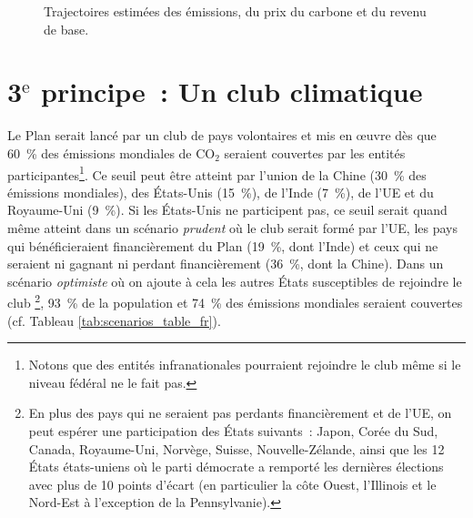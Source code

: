 \documentclass[a5paper,french,openany]{memoir}
\begin{document}
\begin{figure}[h!]
  \caption[Trajectoires (émissions, prix, revenu de base)]{Trajectoires estimées des émissions, du prix du carbone et du revenu de base.}\label{fig:trajectory}
\end{figure} 

\section{3$^\text{e}$ principe~: Un club climatique}

Le Plan serait lancé par un club de pays volontaires et mis en œuvre dès que 60~\% des émissions mondiales de CO$_\text{2}$ seraient couvertes par les entités participantes\footnote{Notons que des entités infranationales pourraient rejoindre le club même si le niveau fédéral ne le fait pas.}. Ce seuil peut être atteint par l'union de la Chine (30~\% des émissions mondiales), des États-Unis (15~\%), de l'Inde (7~\%), de l'UE et du Royaume-Uni (9~\%). Si les États-Unis ne participent pas, ce seuil serait quand même atteint dans un scénario \textit{prudent} où le club serait formé par l'UE, les pays qui bénéficieraient financièrement du Plan (19~\%, dont l'Inde) et ceux qui ne seraient ni gagnant ni perdant financièrement (36~\%, dont la Chine). %
Dans un scénario \textit{optimiste} où on ajoute à cela les autres États susceptibles de rejoindre le club
\footnote{En plus des pays qui ne seraient pas perdants financièrement et de l'UE, on peut espérer une participation des États suivants~: Japon, Corée du Sud, Canada, Royaume-Uni, Norvège, Suisse, Nouvelle-Zélande, ainsi que les 12 États états-uniens où le parti démocrate a remporté les dernières élections avec plus de 10 points d'écart (en particulier la côte Ouest, l'Illinois et le Nord-Est à l'exception de la Pennsylvanie).}, 
93~\% de la population et 74~\% des émissions mondiales seraient couvertes (cf. Tableau \ref{tab:scenarios_table_fr}). 
\end{document}
